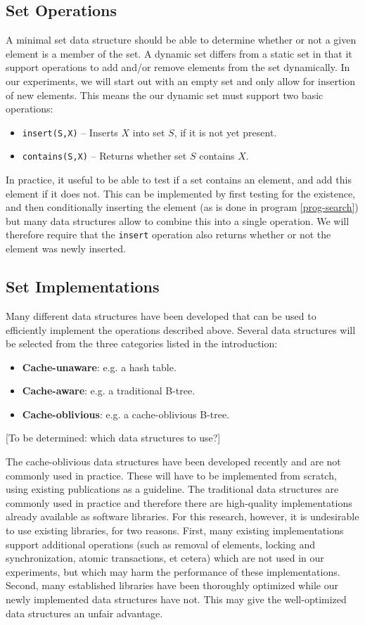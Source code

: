 \documentclass{acm_proc_article-sp}
\begin{document}
\subsection{Set Operations}
A minimal set data structure should be able to determine whether or not a given element is a member of the set. A dynamic set differs from a static set in that it support operations to add and/or remove elements from the set dynamically. In our experiments, we will start out with an empty set and only allow for insertion of new elements. This means the our dynamic set must support two basic operations:
\begin{itemize}
\item \verb#insert(S,X)# -- Inserts $X$ into set $S$, if it is not yet present.
\item \verb#contains(S,X)# -- Returns whether set $S$ contains $X$.
\end{itemize}
In practice, it useful to be able to test if a set contains an element, and add this element if it does not. This can be implemented by first testing for the existence, and then conditionally inserting the element (as is done in program \ref{prog-search}) but many data structures allow to combine this into a single operation. We will therefore require that the \verb#insert# operation also returns whether or not the element was newly inserted.

\subsection{Set Implementations}
Many different data structures have been developed that can be used to efficiently implement the operations described above. Several data structures will be selected from the three categories listed in the introduction:
\begin{itemize}
\item \textbf{Cache-unaware}: e.g. a hash table.
\item \textbf{Cache-aware}: e.g. a traditional B-tree.
\item \textbf{Cache-oblivious}: e.g. a cache-oblivious B-tree.
\end{itemize}
[To be determined: which data structures to use?]

The cache-oblivious data structures have been developed recently and are not commonly used in practice. These will have to be implemented from scratch, using existing publications as a guideline. The traditional data structures are commonly used in practice and therefore there are high-quality implementations already available as software libraries. For this research, however, it is undesirable to use existing libraries, for two reasons. First, many existing implementations support additional operations (such as removal of elements, locking and synchronization, atomic transactions, et cetera) which are not used in our experiments, but which may harm the performance of these implementations. Second, many established libraries have been thoroughly optimized while our newly implemented data structures have not. This may give the well-optimized data structures an unfair advantage.
\end{document}

